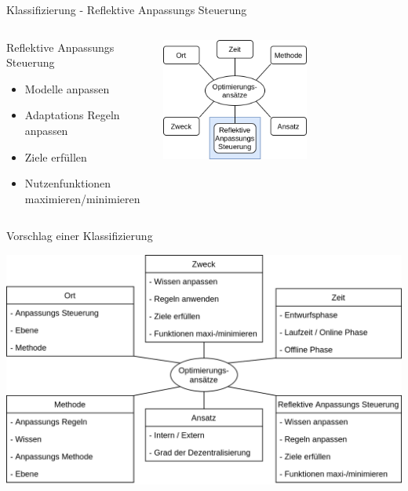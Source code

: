 \documentclass[de,16:9]{sdqbeamer}
\begin{document}
\begin{frame}{Klassifizierung - Reflektive Anpassungs Steuerung}
	\begin{columns}
		 \begin{center}
			\begin{greenblock}{Reflektive Anpassungs Steuerung}
				\begin{itemize}
					\item Modelle anpassen
					\item Adaptations Regeln anpassen
					\item Ziele erfüllen
					\item Nutzenfunktionen maximieren/minimieren
				\end{itemize}
			\end{greenblock}
		\end{center}
		 \begin{center}
			\includegraphics[width=0.6\textwidth]{sources/ClassificationProposal-Proposal_DE_RAC.png}
		\end{center}
	\end{columns}
\end{frame}

\begin{frame}{Vorschlag einer Klassifizierung}
	\begin{center}
		\includegraphics[width=.6\textwidth]{sources/ClassificationProposal-WithDimensions_DE.png}
	\end{center}
\end{frame}
\end{document}
